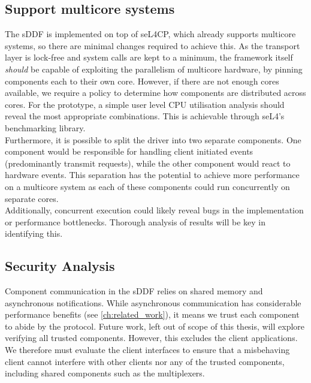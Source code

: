 \subsection{Support multicore systems}\label{s:multicore}
The sDDF is implemented on top of seL4CP, which already supports multicore systems, so there are minimal changes required
to achieve this. As the transport layer is lock-free and system calls are kept to a minimum, the framework itself 
\emph{should} be capable of exploiting the parallelism of multicore hardware, by pinning components each to their 
own core. However, if there are not enough cores available, we require a policy to determine how components are distributed
across cores. For the prototype, a simple user level CPU utilisation analysis should reveal the most appropriate combinations.
This is achievable through seL4's benchmarking library.\\
Furthermore, it is possible to split the driver into two separate components. One component would be responsible for
handling client initiated events (predominantly transmit requests), while the other component would react to 
hardware events. This separation has the potential to achieve more performance on a multicore system as
each of these components could run concurrently on separate cores.\\
Additionally, concurrent execution could likely reveal bugs in the implementation or performance bottlenecks. Thorough 
analysis of results will be key in identifying this.

\subsection{Security Analysis}\label{s:security}
Component communication in the sDDF relies on shared memory and asynchronous notifications. While asynchronous communication
has considerable performance benefits (see \autoref{ch:related_work}), it means we trust each component to abide by the protocol. 
Future work, left out of scope of this thesis, will explore verifying all trusted components. However, this excludes the client
applications. We therefore must evaluate the client interfaces to ensure that a misbehaving client cannot interfere with other clients
nor any of the trusted components, including shared components such as the multiplexers. 

